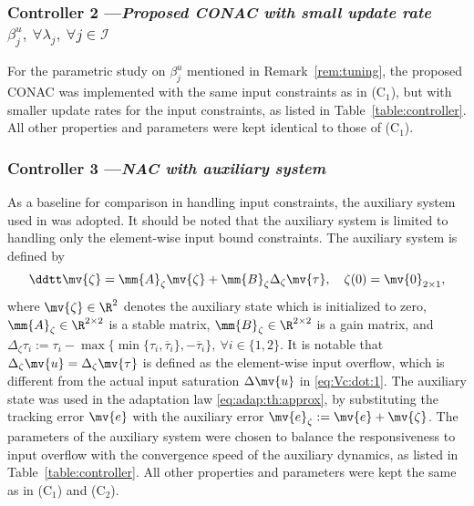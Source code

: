 \documentclass[letterpaper, journal]{IEEEtran}
\begin{document}
\subsubsection*{Controller 2 —\textit{Proposed CONAC with small update rate $\beta^u_j,\ \forall\lambda_j,\ \forall j\in\mathcal{I}$}}

For the parametric study on $\beta_j^u$ mentioned in Remark~\ref{rem:tuning}, the proposed CONAC was implemented with the same input constraints as in (C$_1$), but with smaller update rates for the input constraints, as listed in Table~\ref{table:controller}.
All other properties and parameters were kept identical to those of (C$_1$).

\subsubsection*{Controller 3 —\textit{NAC with auxiliary system}}

As a baseline for comparison in handling input constraints, the auxiliary system used in \cite{Rezaei:2025aa,Liu:2025aa,Yu:2022aa} was adopted.
It should be noted that the auxiliary system is limited to handling only the element-wise input bound constraints.
The auxiliary system is defined by 
\begin{equation}
  \ddtt \mv{\zeta} 
  =
  \mm{A}_{\zeta}
  \mv{\zeta}
  +
  \mm{B}_{\zeta}
  \Delta_{\zeta} \mv{\tau}
  ,
  \quad
  \zeta(0) 
  = 
  \mv{0}_{2\times 1}
  ,
\end{equation}
where $\mv{\zeta}\in\R^2$ denotes the auxiliary state which is initialized to zero, $\mm{A}_{\zeta}\in\R^{2\times 2}$ is a stable matrix, $\mm{B}_{\zeta}\in\R^{2\times 2}$ is a gain matrix, and $\Delta_{\zeta} \tau_i := \tau_i - \max\{\min\{\tau_i, \overline{\tau}_i\}, -\overline{\tau}_i\},\ \forall i\in\{1,2\}$.
It is notable that $\Delta_{\zeta}\mv{u}=\Delta_{\zeta}\mv{\tau}$ is defined as the element-wise input overflow, which is different from the actual input saturation $\Delta\mv{u}$ in \eqref{eq:Vc:dot:1}.
The auxiliary state was used in the adaptation law \eqref{eq:adap:th:approx}, by substituting the tracking error $\mv{e}$ with the auxiliary error $\mv{e}_\zeta := \mv{e} + \mv{\zeta}$.
The parameters of the auxiliary system were chosen to balance the responsiveness to input overflow with the convergence speed of the auxiliary dynamics, as listed in Table~\ref{table:controller}.
All other properties and parameters were kept the same as in (C$_1$) and (C$_2$).
\end{document}
